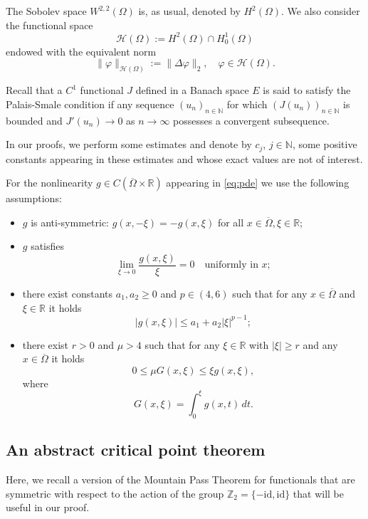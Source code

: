 \documentclass[10pt,a4paper]{amsart}
\numberwithin{equation}{section}
\begin{document}
The Sobolev space $W^{2, 2}(\Omega)$ is, as usual, denoted by $H^2(\Omega)$. 
We also consider the functional space
\[
 \mathcal{H}(\Omega) := H^2(\Omega) \cap H_0^1(\Omega)
\]
endowed with the equivalent norm
\[
 \|\varphi\|_{\mathcal{H}(\Omega)} := \|\Delta \varphi\|_2, \quad \varphi \in \mathcal{H}(\Omega).
\]

Recall that a $C^1$ functional $J$ defined in a Banach space $E$ is said to satisfy the 
Palais-Smale condition if any sequence $(u_n)_{n \in \mathbb N}$ for which 
$(J(u_n))_{n \in \mathbb N}$ is bounded and $J'(u_n) \to 0$ as $n \to \infty$ possesses 
a convergent subsequence.

In our proofs, we perform some estimates and denote by $c_j$, $j \in \mathbb N$, some 
positive constants appearing in these estimates and whose exact values are not of 
interest.

For the nonlinearity $g \in C(\overline \Omega \times \mathbb R)$ appearing in 
\eqref{eq:pde} we use the following assumptions:
\begin{itemize}
\item[(A1)] %
$g$ is anti-symmetric: $g(x, - \xi) = - g(x, \xi)$ for all $x \in \overline \Omega, \xi \in \mathbb R$;

\item[(A2)] %
 $g$ satisfies
\[
 \lim_{\xi \to 0} \frac{g(x, \xi)}{\xi} = 0 \quad \text{uniformly in } x;
\]

\item[(A3)] %
there exist constants $a_1, a_2 \geq 0$ and $p \in (4, 6)$ such that for any $x \in \overline \Omega$ and $\xi \in \mathbb R$ it holds
\[
 |g(x, \xi)| \leq a_1 + a_2 |\xi|^{p - 1};
\]

\item[(A4)] %
there exist $r > 0$ and $\mu > 4$ such that for any $\xi \in \mathbb R$ with $|\xi| \geq r$ and any $x \in \overline \Omega$ it holds
 \[
 0 \leq \mu G(x, \xi) \leq \xi g(x, \xi),
 \]
where
 \[
 G(x, \xi) = \int_0^\xi g(x, t) \,dt.
 \]
\end{itemize}

\subsection{An abstract critical point theorem}

Here, we recall a version of the Mountain Pass Theorem for functionals that 
are symmetric with respect to the action of the group 
$\mathbb Z_2 = \{- \text{id}, \text{id}\}$ that will be useful in our proof.
\end{document}
